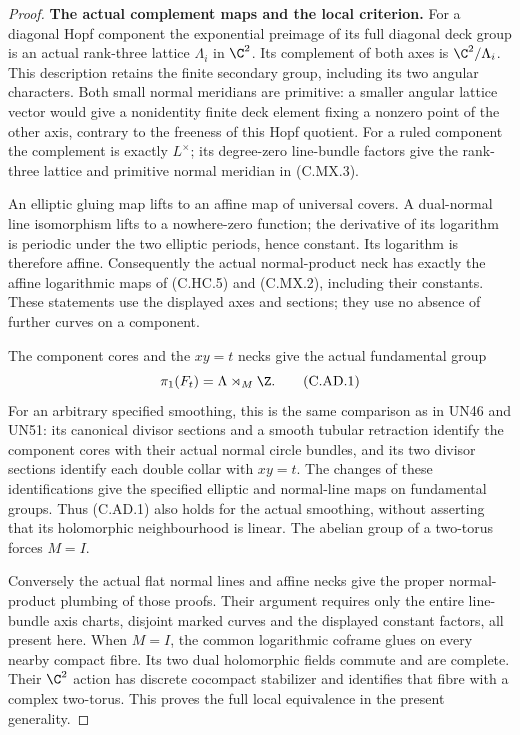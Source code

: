 \begin{proof}
\par\medskip\noindent\textbf{The actual complement maps and the local criterion.}
For a diagonal Hopf component the exponential preimage of its full
diagonal deck group is an actual rank-three lattice $\Lambda_i$ in
$\C^2$. Its complement of both axes is $\C^2/\Lambda_i$. This
description retains the finite secondary group, including its two
angular characters. Both small normal meridians are primitive: a
smaller angular lattice vector would give a nonidentity finite deck
element fixing a nonzero point of the other axis, contrary to the
freeness of this Hopf quotient. For a ruled component the complement
is exactly $L^\times$; its degree-zero line-bundle factors give the
rank-three lattice and primitive normal meridian in (C.MX.3).

An elliptic gluing map lifts to an affine map of universal covers.
A dual-normal line isomorphism lifts to a nowhere-zero function;
the derivative of its logarithm is periodic under the two elliptic
periods, hence constant. Its logarithm is therefore affine.
Consequently the actual normal-product neck has exactly the affine
logarithmic maps of (C.HC.5) and (C.MX.2), including their constants.
These statements use the displayed axes and sections; they use no
absence of further curves on a component.

The component cores and the $xy=t$ necks give the actual fundamental
group
\[
                         \pi_1(F_t)=\Lambda\rtimes_M\Z.
                                                        \tag{C.AD.1}
\]
For an arbitrary specified smoothing, this is the same comparison
as in UN46 and UN51: its canonical divisor sections and a smooth
tubular retraction identify the component cores with their actual
normal circle bundles, and its two divisor sections identify each
double collar with $xy=t$. The changes of these identifications
give the specified elliptic and normal-line maps on fundamental
groups. Thus (C.AD.1) also holds for the actual smoothing, without
asserting that its holomorphic neighbourhood is linear. The
abelian group of a two-torus forces $M=I$.

Conversely the actual flat normal lines and affine necks give the
proper normal-product plumbing of those proofs. Their argument
requires only the entire line-bundle axis charts, disjoint marked
curves and the displayed constant factors, all present here.
When $M=I$, the common logarithmic coframe glues on every nearby
compact fibre. Its two dual holomorphic fields commute and are
complete. Their $\C^2$ action has discrete cocompact stabilizer
and identifies that fibre with a complex two-torus. This proves
the full local equivalence in the present generality.


\end{proof}
